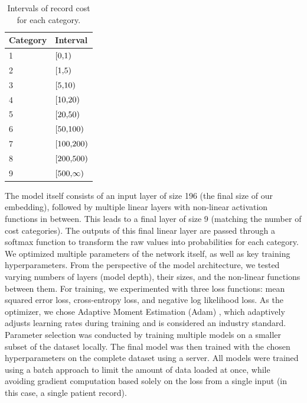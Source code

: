 \begin{table}[!h]
	\centering
	\begin{tabular}{|l|l|}
		\hline
		Category  & Interval \\ \hline
		1 & $\interval[{0,1})$ \\ \hline
		2 & $\interval[{1,5})$ \\ \hline
		3 & $\interval[{5,10})$ \\ \hline
		4 & $\interval[{10,20})$ \\ \hline
		5 & $\interval[{20,50})$ \\ \hline
		6 & $\interval[{50,100})$ \\ \hline
		7 & $\interval[{100,200})$ \\ \hline
		8 & $\interval[{200,500})$ \\ \hline
		9 & $\interval[{500,\infty})$ \\ \hline
	\end{tabular}
	\caption{Intervals of record cost for each category.}
	\label{tab:cat_interval_record}
\end{table}  

The model itself consists of an input layer of size 196 (the final size of our embedding), followed by multiple linear layers with non-linear activation functions in between. This leads to a final layer of size 9 (matching the number of cost categories). The outputs of this final linear layer are passed through a softmax function to transform the raw values into probabilities for each category.
\\

We optimized multiple parameters of the network itself, as well as key training hyperparameters. From the perspective of the model architecture, we tested varying numbers of layers (model depth), their sizes, and the non-linear functions between them. For training, we experimented with three loss functions: mean squared error loss, cross-entropy loss, and negative log likelihood loss. As the optimizer, we chose Adaptive Moment Estimation (Adam) \cite{adam}, which adaptively adjusts learning rates during training and is considered an industry standard.
\\

Parameter selection was conducted by training multiple models on a smaller subset of the dataset locally. The final model was then trained with the chosen hyperparameters on the complete dataset using a server. All models were trained using a batch approach to limit the amount of data loaded at once, while avoiding gradient computation based solely on the loss from a single input (in this case, a single patient record).
